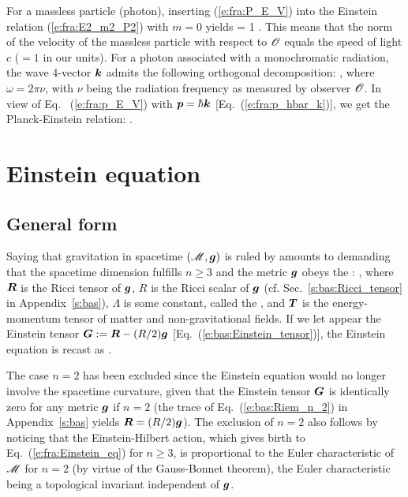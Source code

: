 For a massless particle (photon), inserting (\ref{e:fra:P_E_V}) into the
Einstein relation (\ref{e:fra:E2_m2_P2}) with $m=0$ yields
\be \label{e:fra:photon_V_one}
    \cdot{} = 1 .
\ee
This means that the norm of the velocity of the massless particle with respect to $\mathscr{O}$
equals the speed of light $c$ ($=1$ in our units).
For a photon associated with a monochromatic radiation, the wave 4-vector $\bm{k}$
admits the following orthogonal decomposition:
\be
   ,
\ee
where $\omega = 2\pi \nu$, with $\nu$ being the radiation frequency as measured by
observer $\mathscr{O}$. In view of Eq.~ (\ref{e:fra:p_E_V}) with $\bm{p} = \hbar\bm{k}$
[Eq.~(\ref{e:fra:p_hbar_k})], we
get the Planck-Einstein relation:
\be \label{e:fra:Planck_Einstein}
    .
\ee

\section{Einstein equation} \label{s:fra:Einstein_eq}

\subsection{General form}

Saying that gravitation in spacetime $(\mathscr{M}, \bm{g})$ is ruled by
 amounts
to demanding that the spacetime dimension fulfills $n\geq 3$ and
the metric $\bm{g}$ obeys the :
\be \label{e:fra:Einstein_eq}
    ,
\ee
where $\bm{R}$ is the Ricci tensor of $\bm{g}$, $R$ is the
Ricci scalar of $\bm{g}$
(cf. Sec.~\ref{s:bas:Ricci_tensor} in Appendix~\ref{s:bas}), $\Lambda$ is some
constant, called the ,
and $\bm{T}$ is the energy-momentum tensor of
matter and non-gravitational fields. If we let appear the
Einstein tensor $\bm{G} := \bm{R} - (R/2) \bm{g}$
[Eq.~(\ref{e:bas:Einstein_tensor})], the Einstein equation is recast as
\be \label{e:fra:Einstein_eq_G}
    .
\ee

\begin{remark} \label{r:fra:Einstein_eq_n_2}
The case $n=2$ has been excluded since the Einstein equation would
no longer involve the spacetime curvature, given that the Einstein tensor
$\bm{G}$ is identically zero for any metric $\bm{g}$ if $n=2$
(the trace of Eq.~(\ref{e:bas:Riem_n_2}) in Appendix~\ref{s:bas} yields
$\bm{R} = (R/2) \bm{g}$).
The exclusion of $n=2$ also follows by noticing that
the Einstein-Hilbert action,
which gives birth to Eq.~(\ref{e:fra:Einstein_eq})
for $n\geq 3$, is proportional to the
Euler characteristic
of $\mathscr{M}$ for $n=2$ (by virtue of the Gauss-Bonnet theorem),
the Euler characteristic being a topological invariant independent of $\bm{g}$.
\end{remark}

